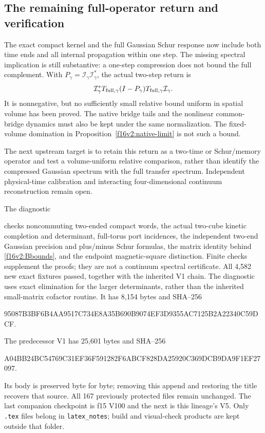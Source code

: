 \documentclass[11pt,oneside]{article}
\begin{document}
\subsection{The remaining full-operator return and verification}

The exact compact kernel and the full Gaussian Schur response
now include both time ends and all internal propagation within
one step. The missing spectral implication is still substantive:
a one-step compression does not bound the full complement.
With \(P_\gamma=\mathcal I_\gamma\mathcal I_\gamma^*\),
the actual two-step return is
\[
 \mathcal I_\gamma^*T_{\rm full,\gamma}
       (I-P_\gamma)T_{\rm full,\gamma}\mathcal I_\gamma .
\]
It is nonnegative, but no sufficiently small relative bound
uniform in spatial volume has been proved. The native bridge
tails and the nonlinear common-bridge dynamics must also be
kept under the same normalization. The fixed-volume domination
in Proposition~\ref{f16v2:native-limit} is not such a bound.

The next upstream target is to retain this return as a
two-time or Schur/memory operator and test a volume-uniform
relative comparison, rather than identify the compressed
Gaussian spectrum with the full transfer spectrum.
Independent physical-time calibration and interacting
four-dimensional continuum reconstruction remain open.

The diagnostic
\begin{center}\small
{}
\end{center}
checks noncommuting two-ended compact words, the actual
two-cube kinetic completion and determinant, full-torus port
incidences, the independent two-end Gaussian precision and
plus/minus Schur formulas, the matrix identity behind
\eqref{f16v2:Bbounds}, and the endpoint magnetic-square
distinction. Finite checks supplement the proofs; they are not
a continuum spectral certificate. All 4,582 new exact fixtures passed,
together with the inherited V1 chain. The diagnostic uses exact
elimination for the larger determinants, rather than the inherited
small-matrix cofactor routine. It has 8,154 bytes and SHA--256
\begin{center}\scriptsize\ttfamily
95087B3BF6B4AA9517C734E8A35B690B9074EF3D9355AC7125B2A22340C59DCF.
\end{center}

The predecessor V1 has 25,601 bytes and SHA--256
\begin{center}\scriptsize\ttfamily
A04BB24BC54769C31EF36F591282F6ABCF828DA25920C369DCB9DA9F1EF27097.
\end{center}
Its body is preserved byte for byte; removing this append and
restoring the title recovers that source. All 167 previously
protected files remain unchanged. The last companion
checkpoint is f15 V100 and the next is this lineage's V5.
Only \texttt{.tex} files belong in \texttt{latex\_notes};
build and visual-check products are kept outside that folder.
\end{document}
